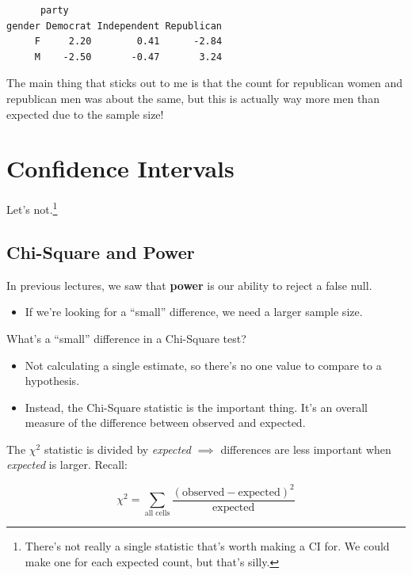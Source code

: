 \documentclass[
  letterpaper,
  DIV=11,
  numbers=noendperiod,
  oneside]{scrreprt}
\providecommand{\tightlist}{%
  \setlength{\itemsep}{0pt}\setlength{\parskip}{0pt}}\usepackage{longtable,booktabs,array}
\begin{document}
\begin{verbatim}
      party
gender Democrat Independent Republican
     F     2.20        0.41      -2.84
     M    -2.50       -0.47       3.24
\end{verbatim}

The main thing that sticks out to me is that the count for republican
women and republican men was about the same, but this is actually way
more men than expected due to the sample size!

\hypertarget{confidence-intervals-2}{%
\section{Confidence Intervals}\label{confidence-intervals-2}}

Let's not.\footnote{There's not really a single statistic that's worth
  making a CI for. We could make one for each expected count, but that's
  silly.}

\hypertarget{chi-square-and-power}{%
\subsection{Chi-Square and Power}\label{chi-square-and-power}}

In previous lectures, we saw that \textbf{power} is our ability to
reject a false null.

\begin{itemize}
\tightlist
\item
  If we're looking for a ``small'' difference, we need a larger sample
  size.
\end{itemize}

\pspace

What's a ``small'' difference in a Chi-Square test?

\begin{itemize}
\tightlist
\item
  Not calculating a single estimate, so there's no one value to compare
  to a hypothesis.
\item
  Instead, the Chi-Square statistic is the important thing. It's an
  overall measure of the difference between observed and expected.
\end{itemize}

The \(\chi^2\) statistic is divided by \emph{expected} \(\implies\)
differences are less important when \emph{expected} is larger. Recall:

\[
\chi^2 = \sum_{\text{all cells}}\frac{(\text{observed} - \text{expected})^2}{\text{expected}}
\]
\end{document}
